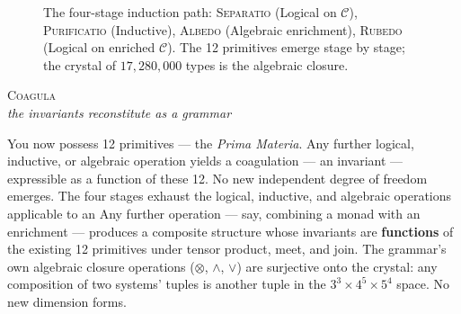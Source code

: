 \documentclass[12pt,a4paper]{article}
\begin{document}
\begin{figure}[htbp]
{
}

\caption{The four-stage induction path: \textsc{Separatio} (Logical on $\mathcal{C}$), \textsc{Purificatio} (Inductive), \textsc{Albedo} (Algebraic enrichment), \textsc{Rubedo} (Logical on enriched $\mathcal{C}$). The 12 primitives emerge stage by stage; the crystal of $17{,}280{,}000$ types is the algebraic closure.}
\label{fig:induction-path}
\end{figure}

\begin{center}
\vspace{0.6em}
{\large\textsc{Coagula}}\\[4pt]
{\small\itshape the invariants reconstitute as a grammar}
\vspace{0.4em}
\end{center}

You now possess 12 primitives --- the \emph{Prima Materia}. Any further logical, inductive, or algebraic operation
yields a coagulation --- an invariant --- expressible as a function of these 12. No new independent degree of freedom
emerges. The four stages exhaust the logical, inductive, and algebraic operations applicable to an
Any further operation --- say, combining a monad with an enrichment --- produces a composite structure whose invariants
are \textbf{functions} of the existing 12 primitives under tensor product, meet, and join. The grammar's own algebraic
closure operations ($\otimes$, $\wedge$, $\vee$) are surjective onto the crystal: any composition of two systems'
tuples is another tuple in the $3^3 \times 4^5 \times 5^4$ space. No new dimension forms.
\end{document}
